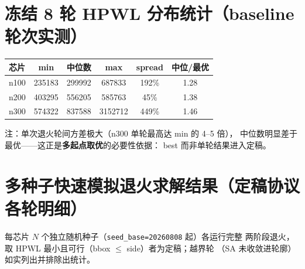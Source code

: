\documentclass[12pt,a4paper]{article}
\begin{document}
\section{冻结 8 轮 HPWL 分布统计（baseline 轮次实测）}

\begin{table}[H]
\centering
\scriptsize
\setlength{\tabcolsep}{3pt}
\begin{tabular}{lccccc}
\toprule
芯片 & min & 中位数 & max & spread & 中位/最优 \\
\midrule

n100 & 235183 & 299992 & 687833 & 192\% & 1.28 \\
n200 & 403295 & 556205 & 585763 & 45\% & 1.38 \\
n300 & 574322 & 837588 & 3152712 & 449\% & 1.46 \\
\bottomrule
\end{tabular}
\end{table}

注：单次退火轮间方差极大（n300 单轮最高达 min 的 4--5 倍），
中位数明显差于最优——这正是\textbf{多起点取优}的必要性依据：
best 而非单轮结果进入定稿。


\section{多种子快速模拟退火求解结果（定稿协议各轮明细）}

每芯片 $N$ 个独立随机种子（\texttt{seed\_base=20260808} 起）各运行完整
两阶段退火，取 HPWL 最小且可行（bbox $\le$ side）者为定稿；越界轮
（SA 未收敛进轮廓）如实列出并排除出统计。
\end{document}

